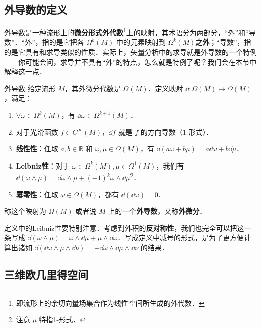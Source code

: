 

\subsection{外导数的定义}

外导数是一种流形上的\textbf{微分形式外代数}\footnote{即流形上的余切向量场集合作为线性空间所生成的外代数．}上的映射，其术语分为两部分，“外”和“导数”．“外”，指的是它把各 $\Omega^k(M)$ 中的元素映射到 $\Omega^k(M)$\textbf{之外}；“导数”，指的是它具有和求导类似的性质．实际上，矢量分析中的求导就是外导数的一个特例——你可能会问，求导并不具有“外”的特点，怎么就是特例了呢？我们会在本节中解释这一点．

\begin{definition}{外导数}\label{ExtDer_def1}
给定流形 $M$，其外微分代数是 $\Omega (M)$．定义映射 $\dd:\Omega (M)\rightarrow\Omega (M)$，满足：
\begin{enumerate}
\item $\forall \omega\in\Omega^k(M)$，有 $\dd \omega\in\Omega^{k+1}(M)$．
\item 对于光滑函数 $f\in C^\infty(M)$，$\dd f$ 就是 $f$ 的方向导数（1-形式）．
\item \textbf{线性性}：任取 $a, b\in \mathbb{R}$ 和 $\omega, \mu\in\Omega(M)$，有 $\dd(a\omega+b\mu)=a\dd\omega+b\dd\mu$．
\item \textbf{Leibniz性}：对于 $\omega\in\Omega^k(M), \mu\in\Omega^1(M)$，我们有 $\dd(\omega\wedge\mu)=\dd\omega\wedge\mu+(-1)^k\omega\wedge\dd\mu$\footnote{注意 $\mu$ 特指1-形式．}．
\item \textbf{幂零性}：任取 $\omega\in\Omega(M)$，都有 $\dd(\dd\omega)=0$．
\end{enumerate}
称这个映射为 $\Omega (M)$ 或者说 $M$ 上的一个\textbf{外导数}，又称\textbf{外微分}．
\end{definition}

定义中的Leibniz性要特别注意．考虑到外积的\textbf{反对称性}，我们也完全可以把这一条写成 $\dd(\omega\wedge\mu)=\omega\wedge\dd\mu+\mu\wedge\dd\omega$．写成定义中减号的形式，是为了更方便计算出诸如 $\dd(\dd\omega\wedge\mu\wedge\dd\nu)=-\dd\omega\wedge\dd\mu\wedge\dd\nu$ 的结果．



\subsection{三维欧几里得空间}

